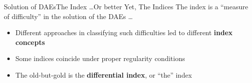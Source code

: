 \begin{frame}{Solution of \aclp{DAE}}{The Index \dots Or better Yet, The Indices}
  The index is a ``measure of difficulty'' in the solution of the \acsp{DAE} \dots
  \begin{itemize}[<+->]
    \item Different approaches in classifying such difficulties led to different \textbf{index concepts} \\
    \item Some indices coincide under proper regularity conditions
    \item The old-but-gold is the \textbf{differential index}, or ``the'' index
  \end{itemize}
  \vspace{0.5em}
\end{frame}

